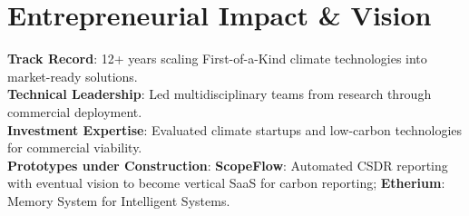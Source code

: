 \documentclass{../../templates/karthicv-single}
\begin{document}
\section{Entrepreneurial Impact \& Vision}
\textbf{Track Record}: 12+ years scaling First-of-a-Kind climate technologies into market-ready solutions. \\
\textbf{Technical Leadership}: Led multidisciplinary teams from research through commercial deployment. \\
\textbf{Investment Expertise}: Evaluated climate startups and low-carbon technologies for commercial viability.\\
\textbf{Prototypes under Construction}: \textbf{ScopeFlow}: Automated CSDR reporting with eventual vision to become vertical SaaS for carbon reporting; \textbf{Etherium}: Memory System for Intelligent Systems. \\
\end{document}
